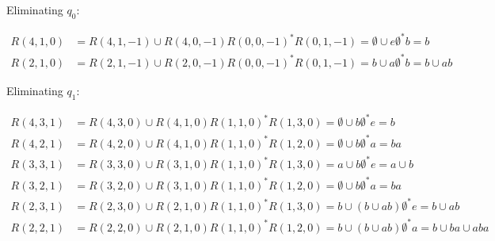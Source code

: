 \documentclass[12pt]{article}
\begin{document}
Eliminating $q_0$:

\begin{equation*}
	\begin{split}
		R(4, 1, 0) & = R(4, 1, -1) \cup R(4, 0, -1)R(0, 0, -1)^{*}R(0, 1, -1) = \emptyset \cup e \emptyset^* b = b \\
		R(2, 1, 0) & = R(2, 1, -1) \cup R(2, 0, -1)R(0, 0, -1)^{*}R(0, 1, -1) = b \cup a \emptyset^* b = b \cup ab
	\end{split}
\end{equation*}



Eliminating $q_1$:

\begin{equation*}
	\begin{split}
		R(4, 3, 1) & = R(4, 3, 0) \cup R(4, 1, 0)R(1, 1, 0)^{*}R(1, 3, 0) = \emptyset \cup b \emptyset^* e = b \\
		R(4, 2, 1) & = R(4, 2, 0) \cup R(4, 1, 0)R(1, 1, 0)^{*}R(1, 2, 0) = \emptyset \cup b \emptyset^* a = ba \\
		R(3, 3, 1) & = R(3, 3, 0) \cup R(3, 1, 0)R(1, 1, 0)^{*}R(1, 3, 0) = a \cup b \emptyset^* e = a \cup b \\
		R(3, 2, 1) & = R(3, 2, 0) \cup R(3, 1, 0)R(1, 1, 0)^{*}R(1, 2, 0) = \emptyset \cup b \emptyset^* a = ba \\
		R(2, 3, 1) & = R(2, 3, 0) \cup R(2, 1, 0)R(1, 1, 0)^{*}R(1, 3, 0) = b \cup (b \cup ab) \emptyset^* e = b \cup ab \\
		R(2, 2, 1) & = R(2, 2, 0) \cup R(2, 1, 0)R(1, 1, 0)^{*}R(1, 2, 0) = b \cup (b \cup ab) \emptyset^* a = b \cup ba \cup aba
	\end{split}
\end{equation*}
\end{document}
